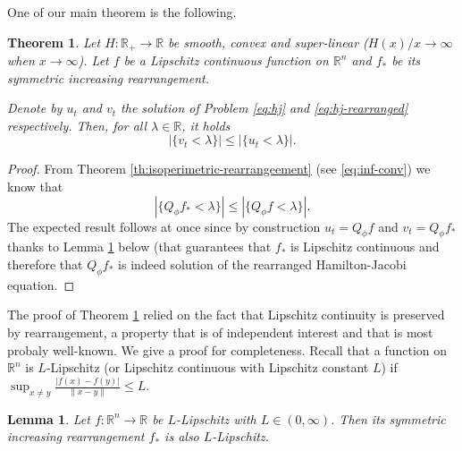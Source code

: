 \documentclass[11pt]{article}
\newtheorem{theorem}[conjecture]{Theorem}
\newtheorem{lemma}[conjecture]{Lemma}
\newcommand{\1}{[1]}
\begin{document}
One of our main theorem is the following.

\begin{theorem} \label{thm:HJ}
Let $H \colon \mathbb{R}_+ \to \mathbb{R}$ be smooth, convex and super-linear ($H(x)/x \to \infty$ when $x \to \infty$). Let $f$ be a Lipschitz continuous function on $\mathbb{R}^n$ and $f_*$ be its symmetric increasing rearrangement.

Denote by $u_t$ and $v_t$ the solution of Problem 
\eqref{eq:hj} and \eqref{eq:hj-rearranged} respectively. Then, for all $\lambda \in \mathbb{R}$, it holds
$$
|\{ v_t < \lambda \}| \leq |\{u_t < \lambda\}| .
$$
\end{theorem}




\begin{proof}
From Theorem \ref{th:isoperimetric-rearrangeement} (see \eqref{eq:inf-conv}) we know that
$$
|\{ Q_\phi f_* < \lambda \}| \leq |\{Q_\phi f < \lambda\}| .
$$
The expected result follows at once since by construction $u_t=Q_\phi f$ and $v_t=Q_\phi f_*$ thanks to Lemma \ref{lem:Lipschitz} below (that guarantees that $f_*$ is Lipschitz continuous and therefore that $Q_\phi f_*$ is indeed solution of the rearranged Hamilton-Jacobi equation.
\end{proof}

The proof of Theorem \ref{thm:HJ} relied on the fact that Lipschitz continuity is preserved by rearrangement, a property that is of independent interest and that is most probaly well-known. We give a proof for completeness. Recall that a function on $\mathbb{R}^n$ is $L$-Lipschitz (or Lipschitz continuous with Lipschitz constant $L$) if $\sup_{x \neq y}\frac{|f(x)-f(y)|}{\|x-y\|} \leq L$.

\begin{lemma} \label{lem:Lipschitz}
Let $f \colon \mathbb{R}^n \to \mathbb{R}$ be $L$-Lipschitz with $L \in (0,\infty)$. Then its symmetric increasing rearrangement $f_*$ is also $L$-Lipschitz.
\end{lemma}
\end{document}
